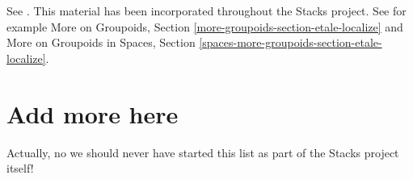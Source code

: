 \noindent
See \cite{K-M}. This material has been incorporated throughout the
Stacks project. See for example
More on Groupoids, Section \ref{more-groupoids-section-etale-localize}
and
More on Groupoids in Spaces, Section
\ref{spaces-more-groupoids-section-etale-localize}.


\section{Add more here}
\label{section-add-more}

\noindent
Actually, no we should never have started this list as part of
the Stacks project itself!









